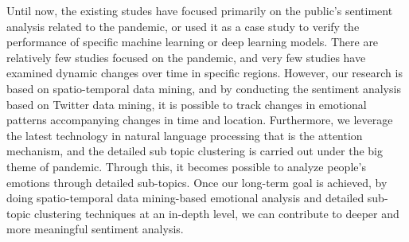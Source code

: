 Until now, the existing studes have focused primarily on the public's
sentiment analysis related to the pandemic, or used it as a case study to
verify the performance of specific machine learning or deep learning models.
There are relatively few studies focused on the pandemic, and very few
studies have examined dynamic changes over time in specific regions. However,
our research is based on spatio-temporal data mining, and by conducting the
sentiment analysis based on Twitter data mining, it is possible to track
changes in emotional patterns accompanying changes in time and location.
Furthermore, we leverage the latest technology in natural language processing
that is the attention mechanism, and the detailed sub topic clustering is
carried out under the big theme of pandemic. Through this, it becomes
possible to analyze people's emotions through detailed sub-topics. Once our
long-term goal is achieved, by doing spatio-temporal data mining-based
emotional analysis and detailed sub-topic clustering techniques at an
in-depth level, we can contribute to deeper and more meaningful sentiment
analysis.